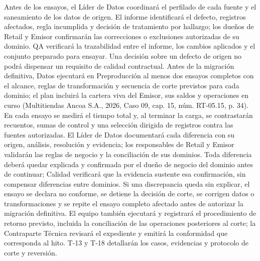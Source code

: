 \documentclass[11pt]{article}
\begin{document}
Antes de los ensayos, el Líder de Datos coordinará el perfilado de cada fuente y el saneamiento de los datos de origen. El informe identificará el defecto, registros afectados, regla incumplida y decisión de tratamiento por hallazgo; los dueños de Retail y Emisor confirmarán las correcciones o exclusiones autorizadas de su dominio. QA verificará la trazabilidad entre el informe, los cambios aplicados y el conjunto preparado para ensayar. Una decisión sobre un defecto de origen no podrá dispensar un requisito de calidad contractual. Antes de la migración definitiva, Datos ejecutará en Preproducción al menos dos ensayos completos con el alcance, reglas de transformación y secuencia de corte previstos para cada dominio; el plan incluirá la cartera viva del Emisor, sus saldos y operaciones en curso (Multitiendas Ancoa S.A., 2026, Caso 09, cap. 15, núm. RT-05.15, p. 34). En cada ensayo se medirá el tiempo total y, al terminar la carga, se contrastarán recuentos, sumas de control y una selección dirigida de registros contra las fuentes autorizadas. El Líder de Datos documentará cada diferencia con su origen, análisis, resolución y evidencia; los responsables de Retail y Emisor validarán las reglas de negocio y la conciliación de sus dominios. Toda diferencia deberá quedar explicada y confirmada por el dueño de negocio del dominio antes de continuar; Calidad verificará que la evidencia sustente esa confirmación, sin compensar diferencias entre dominios. Si una discrepancia queda sin explicar, el ensayo se declara no conforme, se detiene la decisión de corte, se corrigen datos o transformaciones y se repite el ensayo completo afectado antes de autorizar la migración definitiva. El equipo también ejecutará y registrará el procedimiento de retorno previsto, incluida la conciliación de las operaciones posteriores al corte; la Contraparte Técnica revisará el expediente y emitirá la conformidad que corresponda al hito. T-13 y T-18 detallarán los casos, evidencias y protocolo de corte y reversión.
\end{document}
